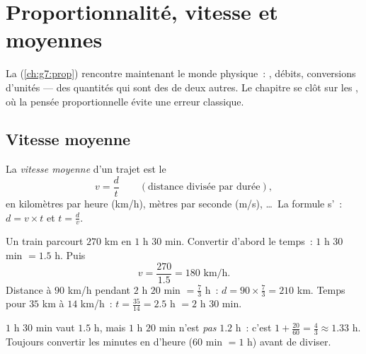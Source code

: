 \chapter{Proportionnalité, vitesse et moyennes}\label{ch:g8:speed}

La  (\cref{ch:g7:prop}) rencontre maintenant le monde
physique~: , débits, conversions d'unités --- des quantités qui
sont des \emph{} de deux autres. Le chapitre se clôt sur les
, où la pensée proportionnelle évite une erreur
classique.

\section{Vitesse moyenne}

\begin{definition}\label{def:g8:speed:def}
La \emph{vitesse moyenne} d'un trajet est le 
\[
v = \frac{d}{t}
\qquad
\left(\text{distance divisée par durée}\right),
\]
en kilomètres par heure (km/h), mètres par seconde (m/s), \dots\ La
formule s'~: $d = v \times t$ et $t = \frac{d}{v}$.
\end{definition}

\begin{example}\label{ex:g8:speed:basic}
Un train parcourt $270$ km en $1$ h $30$ min. Convertir d'abord le
temps~: $1$ h $30$ min $= 1.5$ h. Puis
\[
v = \frac{270}{1.5} = 180 \text{ km/h}.
\]
Distance à $90$ km/h pendant $2$ h $20$ min $= \frac73$ h~:
$d = 90 \times \frac73 = 210$ km. Temps pour $35$ km à $14$ km/h~:
$t = \frac{35}{14} = 2.5$ h $= 2$ h $30$ min.
\end{example}

\begin{remark}
$1$ h $30$ min vaut $1.5$ h, mais $1$ h $20$ min n'est \emph{pas}
$1.2$ h~: c'est $1 + \frac{20}{60} = \frac43 \approx 1.33$ h. Toujours
convertir les minutes en  d'heure ($60$ min $= 1$ h) avant de
diviser.
\end{remark}

